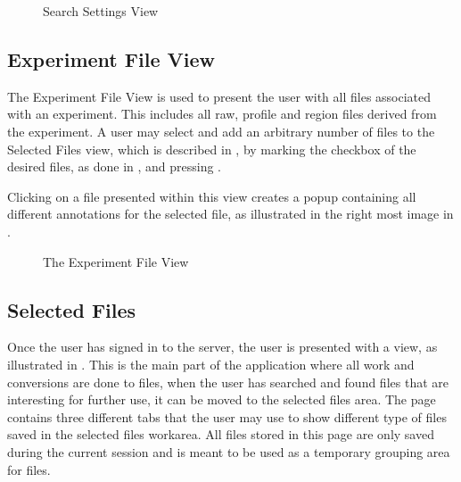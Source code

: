 \begin{figure}[ht]
\caption{Search Settings View}
\label{fig:and_search_settings_man}
\end{figure}
\FloatBarrier


\subsection{Experiment File View}
The Experiment File View is used to present the user with all files associated with an experiment. This includes all raw, profile and region files derived from the experiment. A user may select and add an arbitrary number of files to the Selected Files view, which is described in , by marking the checkbox of the desired files, as done in  , and pressing .

Clicking on a file presented within this view creates a popup containing all different annotations for the selected file, as illustrated in the right most image in .

\begin{figure}[h]
\caption{The Experiment File View}
\label{fig:and_experiment_man}
\end{figure}
\FloatBarrier






\subsection{Selected Files}\label{sec:and_manual_selected}
Once the user has signed in to the server, the user is presented with a  view, as illustrated in .
This is the main part of the application where all work and conversions are done to files, when the user has searched and found files that are interesting for further use, it can be moved to the selected files area. 
The page contains three different tabs that the user may use to show different type of files saved in the selected files workarea. All files stored in this page are only saved during the current session and is meant to be used as a temporary grouping area for files. 

